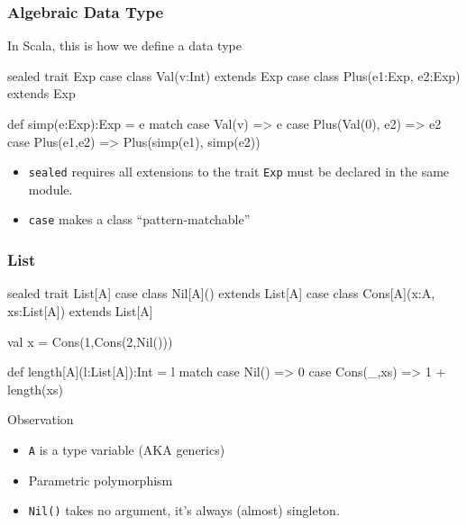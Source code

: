 \documentclass{beamer}
\newcommand{\ignore}[1]{}
\newcommand{\beb}{\begin{exampleblock}}
\newcommand{\eeb}{\end{exampleblock}}
\begin{document}
\begin{frame}[fragile]
\frametitle{Algebraic Data Type} 
In Scala, this is how we define a data type
\beb{}
\begin{code}
sealed trait Exp
case class Val(v:Int) extends Exp
case class Plus(e1:Exp, e2:Exp) extends Exp

def simp(e:Exp):Exp = e match {
   case Val(v) => e
   case Plus(Val(0), e2) => e2
   case Plus(e1,e2) => Plus(simp(e1), simp(e2))
}
\end{code}
\eeb
\begin{itemize}
 \item {\tt sealed} requires all extensions to the trait {\tt Exp} must be
   declared in the same module.
 \item {\tt case} makes a class ``pattern-matchable''
\end{itemize}
\end{frame}

\ignore{
\begin{frame}[fragile]
\frametitle{Algebraic Data Type}
\beb{}
\begin{code}
def simpFix(e:Exp):Exp = {
   val e2 = simp(e)
   if (e == e2) {
      e
   } 
   else {
      simpFix(e2)
   }
}
\end{code}
\eeb
\end{frame}
}


\begin{frame}[fragile]
\frametitle{List}
\beb{}
\begin{code}
sealed trait List[A]
case class Nil[A]() extends List[A]
case class Cons[A](x:A, xs:List[A]) extends List[A]

val x = Cons(1,Cons(2,Nil()))

def length[A](l:List[A]):Int = l match {
   case Nil() => 0
   case Cons(_,xs) => 1 + length(xs)
}
\end{code}
\eeb
Observation
\begin{itemize}
 \item {\tt A} is a type variable (AKA generics)
 \item Parametric polymorphism
 \item {\tt Nil()} takes no argument, it's always (almost) singleton. 
\end{itemize}
\end{frame}
\end{document}
